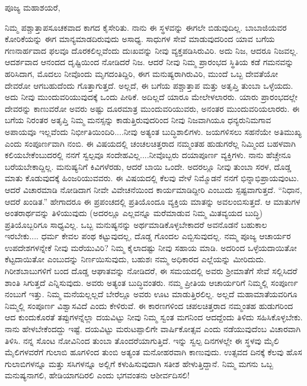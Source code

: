 \noindent
ಪೂಜ್ಯ ಮಹಾಶಯರೆ,

ನಿಮ್ಮ ಪಶ್ಚಾತ್ತಾಪಸೂಚಕವಾದ ಕಾಗದ ಕೈಸೇರಿತು. ನಾನು ಈ ಸ್ಥಳವನ್ನು ಈಗಲೇ ಬಿಡುವುದಿಲ್ಲ. ಬಾಬಾಜಿಯವರ ಕೋರಿಕೆಯನ್ನು ಈಗ ಮಾನ್ಯಮಾಡದಿರುವುದು ಅಸಾಧ್ಯ. ಸಾಧುಗಳ ಸೇವೆ ಮಾಡುವುದರಿಂದ ಯಾವ ಬಗೆಯ ಗಣನಾರ್ಹವಾದ ಫಲವೂ ದೊರಕಲಿಲ್ಲವೆಂದು ದುಃಖವನ್ನು ನೀವು ವ್ಯಕ್ತಪಡಿಸಿರುವಿರಿ. ಅದು ನಿಜ, ಆದರೂ ನಿಜವಲ್ಲ. ಆದರ್ಶವಾದ ಆನಂದದ ದೃಷ್ಟಿಯಿಂದ ನೋಡಿದರೆ ನಿಜ. ಆದರೆ ನೀವು ನಿಮ್ಮ ಪ್ರಾರಂಭದ ಸ್ಥಿತಿಯ ಕಡೆ ಗಮನವನ್ನು ಹರಿಸಿದಾಗ, ಮೊದಲು ನೀವೊಂದು ಮೃಗದಂತಿದ್ದಿರಿ, ಈಗ ಮನುಷ್ಯರಾಗಿರುವಿರಿ, ಮುಂದೆ ಒಬ್ಬ ದೇವತೆಯೋ ದೇವರೋ ಆಗಬಹುದೆಂದು ಗೊತ್ತಾ\break ಗುತ್ತದೆ. ಅಲ್ಲದೆ, ಈ ಬಗೆಯ ಪಶ್ಚಾತ್ತಾಪ ಮತ್ತು ಅತೃಪ್ತಿ ತುಂಬಾ ಒಳ್ಳೆಯದು. ಅದು ನೀವು ಮುಂದುವರಿಯುವುದಕ್ಕೆ ಒಂದು ಪೀಠಿಕೆ. ಅದಿಲ್ಲದೆ ಯಾರೂ ಮೇಲೇಳಲಾರರು. ಯಾರು ಪ್ರಾರಂಭದಲ್ಲೇ ದೇವರನ್ನು ಕಾಣುವರೋ ಅವರು ಅಷ್ಟು ದೂರಮಾತ್ರ ಮುಂದುವರಿಯುವರು, ಅನಂತರ ಮುಂದುವರಿಯಲಾರರು. ಈ ಬಗೆಯ ನಿರಂತರ ಅತೃಪ್ತಿ ನಿಮ್ಮ ಮನಸ್ಸನ್ನು ಕಾಡುತ್ತಿರುವುದರಿಂದ ನೀವು ನಿಜವಾಗಿಯೂ ಧನ್ಯರು\enginline{-}ನಿಮಗಾವ ಅಪಾಯವೂ ಇಲ್ಲವೆಂದು ನಿರ್ಭೀತಿಯಿಂದಿರಿ....ನೀವು ಅತ್ಯಂತ ಬುದ್ಧಿಶಾಲಿಗಳು. ಜಯಗಳಿಸಲು ಸಹನೆಯೇ ಅತಿಮುಖ್ಯ ಎಂದು ಸಂಪೂರ್ಣವಾಗಿ ನಂಬಿ. ಈ ವಿಷಯದಲ್ಲಿ ಚಂಚಲಚಿತ್ತರಾದ ನಮ್ಮಂತಹ ಹುಡುಗರೆಲ್ಲ ನಿಮ್ಮಿಂದ ಬಹಳವಾಗಿ ಕಲಿಯಬೇಕೆಂಬುದರಲ್ಲಿ ನನಗೆ ಸ್ವಲ್ಪವೂ ಸಂದೇಹವಿಲ್ಲ....ನೀವೊಬ್ಬರು ದಯಾಪೂರ್ಣ ವ್ಯಕ್ತಿಗಳು. ನಾನು ಹೆಚ್ಚೇನೂ ಬರೆಯಬೇಕಾದ್ದಿಲ್ಲ. ಮನುಷ್ಯನಿಗೆ ಕಿವಿಗಳೆರಡು, ಆದರೆ ಬಾಯಿ ಒಂದೇ. ಅದರಲ್ಲೂ ನೀವು ತುಂಬಾ ಸರಳ, ದೊಡ್ಡ ಮಾತು ಕೊಡುವುದಕ್ಕೆ ಹಿಂಜರಿಯುವವರು. ಈ ವಿಷಯದಲ್ಲಿ ಕೆಲವು ವೇಳೆ ನಿಮ್ಮೊಡನೆ ನನಗೆ ಭಿನ್ನಾಭಿಪ್ರಾಯವುಂಟು. ಆದರೆ ವಿಚಾರಮಾಡಿ ನೋಡಿದಾಗ ನೀವೇ ವಿವೇಚನೆಯಿಂದ ಕಾರ್ಯಮಾಡಿದ್ದೀರಿ ಎಂಬುದು ಸ್ಪಷ್ಟವಾಗುತ್ತದೆ. “ನಿಧಾನ, ಆದರೆ ಖಂಡಿತ.” ಹೇಗಾದರೂ ಈ ಪ್ರಪಂಚದಲ್ಲಿ ಪ್ರತಿಯೊಂದೂ ವ್ಯಕ್ತಿಯ ಮಾತನ್ನು ಅವಲಂಬಿಸುತ್ತದೆ. ಆ ಮಾತುಗಳ ಅಂತರಾರ್ಥವನ್ನು ತಿಳಿಯುವುದು (ಅದರಲ್ಲೂ ಎಲ್ಲವನ್ನೂ ಮರೆಮಾಡುವ ನಿಮ್ಮ ಮಿತವ್ಯಯದ ಬುದ್ಧಿ) ಪ್ರತಿಯೊಬ್ಬರಿಗೂ ಸಾಧ್ಯವಿಲ್ಲ. ಒಬ್ಬ ಮನುಷ್ಯನನ್ನು ಅರ್ಥಮಾಡಿಕೊಳ್ಳಬೇಕಾದರೆ ಅವನೊಡನೆ ಬಹುಕಾಲ ಇರಬೇಕು.... ಧರ್ಮ ಕೇವಲ ಪಂಥ ಕಟ್ಟುವುದಲ್ಲ, ದೊಡ್ಡ ಗೊಂದಲ ಎಬ್ಬಿಸುವುದಲ್ಲ. ನಮ್ಮ ಪೂಜ್ಯ ಆಚಾರ್ಯರ ಉಪದೇಶಗಳನ್ನೇಕೆ ನೀವು ಮರೆಯುವಿರಿ? ನಿಮ್ಮ ಕೈಲಾದಷ್ಟು ನೀವು ಸಹಾಯ ಮಾಡಿ. ಅದರಿಂದ ಒಳ್ಳೆಯದಾಯಿತೋ ಕೆಟ್ಟದಾಯಿತೋ ಎಂಬುದನ್ನು ನಿರ್ಣಯಿಸುವುದು, ಬಹುಶಃ ನಮ್ಮ ಅಧಿಕಾರದ ಎಲ್ಲೆಯನ್ನು ಮೀರಿದುದು. ಗಿರೀಶಬಾಬುಗಳಿಗೆ ಬಂದ ದೊಡ್ಡ ಆಘಾತವನ್ನು ನೋಡಿದರೆ, ಈ ಸಮಯದಲ್ಲಿ ಅವರು ಶ‍್ರೀಮಾತೆಗೆ ಸೇವೆ ಸಲ್ಲಿಸಿದರೆ ಶಾಂತಿ ಸಿಗುತ್ತದೆ ಎನ್ನಿಸುವುದು. ಅವರು ಅತ್ಯಂತ ಬುದ್ಧಿವಂತರು. ನಮ್ಮ ಪ್ರೀತಿಯ ಆಚಾರ್ಯರಿಗೆ ನಿಮ್ಮಲ್ಲಿ ಸಂಪೂರ್ಣ ನಂಬುಗೆ ಇತ್ತು. ನಿಮ್ಮ ಮನೆಯಲ್ಲಲ್ಲದೆ ಬೇರೆಲ್ಲೂ ಅವರು ಊಟ ಮಾಡುತ್ತಿರಲಿಲ್ಲ. ಅಲ್ಲದೆ ಮಹಾಮಾತೆಯವರಿಗೂ ನಿಮ್ಮಲ್ಲಿ ಸಂಪೂರ್ಣ ವಿಶ್ವಾಸವಿದೆ ಎಂದು ಕೇಳಿರುವೆ. ಈ ಕಾರಣಗಳಿಂದ ಚಪಲಚಿತ್ತರಾದ ನಮ್ಮಂತಹ ಹುಡುಗರಿಂದ ಆದ ಕುಂದುಕೊರತೆ ತಪ್ಪುಗಳನ್ನೆಲ್ಲಾ ದಯವಿಟ್ಟು ನೀವು ನಿಮ್ಮ ಸ್ವಂತ ಮಗನಿಂದ ಆದದ್ದೆಂದು ತಿಳಿದು ಸಹಿಸಿಕೊಳ್ಳಬೇಕು. ನಾನು ಹೇಳಬೇಕೆಂದದ್ದು ಇಷ್ಟೆ. ದಯವಿಟ್ಟು ಮರುಟಪ್ಪಾಲಿಗೇ ವಾರ್ಷಿಕೋತ್ಸವ ಎಂದು ನಡೆಯುವುದೆಂಬ ವಿಚಾರವಾಗಿ ತಿಳಿಸಿ. ನನ್ನ ಸೊಂಟ ನೋವಿನಿಂದ ತುಂಬಾ ತೊಂದರೆಯಾಗುತ್ತಿದೆ. ಇನ್ನು ಸ್ವಲ್ಪ ದಿನಗಳಲ್ಲೇ ಈ ಸ್ಥಳವು ಮೈಲಿ ಮೈಲಿಗಳವರೆಗೆ ಗುಲಾಬಿ ಹೂಗಳಿಂದ ತುಂಬಿ ಅತ್ಯಂತ ಮನೋಹರವಾಗಿ ಕಾಣುವುದು. ಉತ್ಸವದ ದಿನಕ್ಕೆ ಕೆಲವು ಹೊಸ ಗುಲಾಬಿಗಳನ್ನೂ ಮತ್ತು \hbox{ಸಸಿಗಳನ್ನೂ} ಅಲ್ಲಿಗೆ ಕಳುಹಿಸುವುದಾಗಿ ಸತೀಶ ಹೇಳುತ್ತಿದ್ದಾನೆ. ನಿಮ್ಮ ಮಗನು ಒಬ್ಬ ಮನುಷ್ಯನಾಗಲಿ, ಹೇಡಿಯಾಗದಿರಲಿ ಎಂದು ಭಗವಂತನು ಆಶೀರ್ವದಿಸಲಿ!

